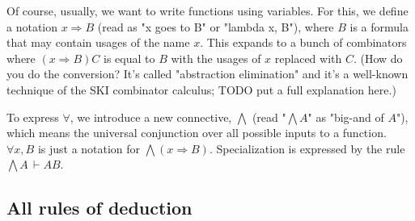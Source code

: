 \documentclass{article}
\begin{document}
  \newcommand{\nameabst}[1]{#1 \Rightarrow}
  
  Of course, usually, we want to write functions using variables. For this, we define a notation $\nameabst{x} B$ (read as "x goes to B" or "lambda x, B"), where $B$ is a formula that may contain usages of the name $x$. This expands to a bunch of combinators where $(\nameabst{x} B) C$ is equal to $B$ with the usages of $x$ replaced with $C$. (How do you do the conversion? It's called "abstraction elimination" and it's a well-known technique of the SKI combinator calculus; TODO put a full explanation here.)
  
  To express $\forall$, we introduce a new connective, $\bigwedge$ (read "$\bigwedge A$" as "big-and of $A$"), which means the universal conjunction over all possible inputs to a function. $\forall x, B$ is just a notation for $\bigwedge (\nameabst{x} B)$. Specialization is expressed by the rule $\bigwedge A\,\vdash AB$.
  
  \subsection{All rules of deduction}
\end{document}
